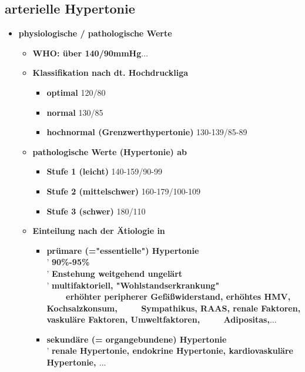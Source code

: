 	\subsection{arterielle Hypertonie}
		\begin{itemize}
			\item \textbf{physiologische / pathologische Werte}
				\begin{itemize}
					\item \textbf{WHO: über 140/90mmHg$\dots$}
					\item \textbf{Klassifikation nach dt. Hochdruckliga}
						\begin{itemize}
							\item \textbf{optimal} 120/80
							\item \textbf{normal} 130/85
							\item \textbf{hochnormal (Grenzwerthypertonie)} 130-139/85-89
						\end{itemize}
					\item \textbf{pathologische Werte (Hypertonie) ab}
						\begin{itemize}
							\item \textbf{Stufe 1 (leicht)} 140-159/90-99
							\item \textbf{Stufe 2 (mittelschwer)} 160-179/100-109
							\item \textbf{Stufe 3 (schwer)} 180/110
						\end{itemize}
					\item \textbf{Einteilung nach der Ätiologie in}
						\begin{itemize}
							\item \textbf{prümare (="essentielle") Hypertonie}\\
								' \textbf{90\%-95\%}\\
								' \textbf{Enstehung weitgehend ungelärt}\\
								' \textbf{multifaktoriell, "Wohlstandserkrankung"}\\
								$\mbox{}\qquad$ \textbf{erhöhter peripherer Gefäßwiderstand, erhöhtes HMV, Kochsalzkonsum,}\linebreak
								$\mbox{}\qquad\:$ \textbf{Sympathikus, RAAS, renale Faktoren, vaskuläre Faktoren, Umweltfaktoren,}\linebreak
								$\mbox{}\qquad\:$ \textbf{Adipositas,$\dots$}
							\item \textbf{sekundäre (= organgebundene) Hypertonie}\\
								' \textbf{renale Hypertonie, endokrine Hypertonie, kardiovaskuläre Hypertonie, $\dots$}

\end{itemize}
\end{itemize}
\end{itemize}
